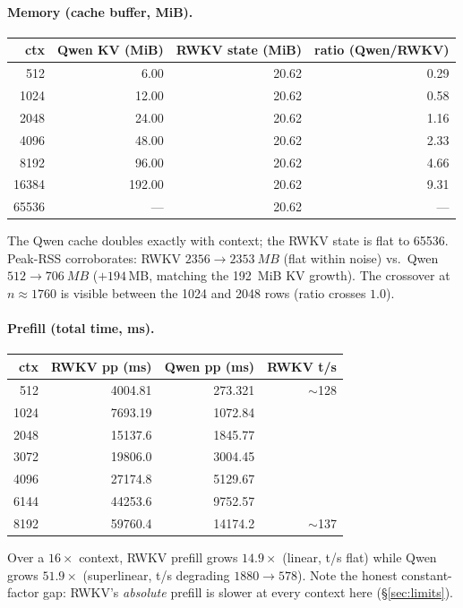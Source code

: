 \documentclass[11pt,a4paper]{article}
\newcommand{\ctx}{\ensuremath{n}}
\begin{document}
\paragraph{Memory (cache buffer, MiB).}
\begin{center}
\begin{tabular}{rrrr}
\toprule
ctx & Qwen KV (MiB) & RWKV state (MiB) & ratio (Qwen/RWKV) \\
\midrule
512    & 6.00   & 20.62 & 0.29 \\
1024   & 12.00  & 20.62 & 0.58 \\
2048   & 24.00  & 20.62 & 1.16 \\
4096   & 48.00  & 20.62 & 2.33 \\
8192   & 96.00  & 20.62 & 4.66 \\
16384  & 192.00 & 20.62 & 9.31 \\
65536  & ---    & 20.62 & --- \\
\bottomrule
\end{tabular}
\end{center}
\noindent The Qwen cache doubles exactly with context; the RWKV state is flat to
\num{65536}. Peak-RSS corroborates: RWKV \(2356 \to \SI{2353}{MB}\) (flat
within noise) vs.\ Qwen \(512 \to \SI{706}{MB}\) (\(+194\,\)MB, matching the
\SI{192}{MiB} KV growth). The crossover at \(\ctx\approx\num{1760}\) is visible
between the \num{1024} and \num{2048} rows (ratio crosses \(1.0\)).

\paragraph{Prefill (total time, ms).}
\begin{center}
\begin{tabular}{rrrr}
\toprule
ctx & RWKV pp (ms) & Qwen pp (ms) & RWKV t/s \\
\midrule
512   & 4004.81 & 273.321 & $\sim$128 \\
1024  & 7693.19 & 1072.84 & \\
2048  & 15137.6 & 1845.77 & \\
3072  & 19806.0 & 3004.45 & \\
4096  & 27174.8 & 5129.67 & \\
6144  & 44253.6 & 9752.57 & \\
8192  & 59760.4 & 14174.2 & $\sim$137 \\
\bottomrule
\end{tabular}
\end{center}
\noindent Over a \(16\times\) context, RWKV prefill grows \(14.9\times\) (linear,
t/s flat) while Qwen grows \(51.9\times\) (superlinear, t/s degrading
\(1880\to578\)). Note the honest constant-factor gap: RWKV's \emph{absolute}
prefill is slower at every context here (\S\ref{sec:limits}).
\end{document}
